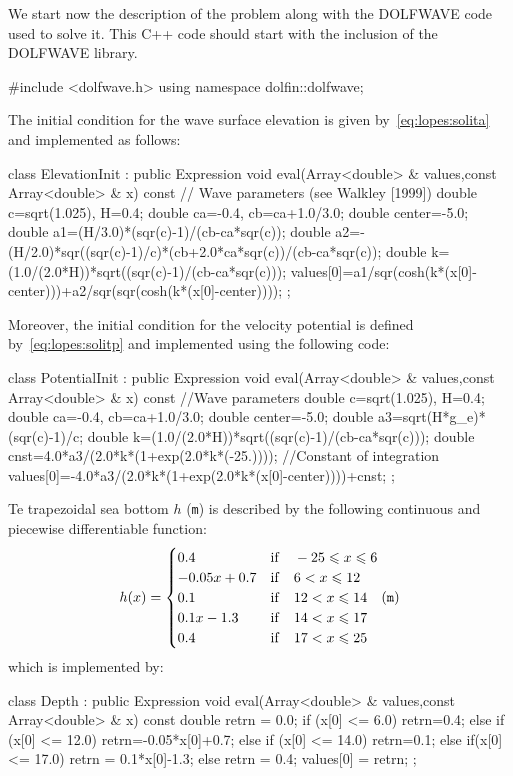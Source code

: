 We start now the description of the problem along with the DOLFWAVE
code used to solve it. This C++ code should start with the inclusion
of the DOLFWAVE library.
\begin{c++}
#include <dolfwave.h>
using namespace dolfin::dolfwave;
\end{c++}
The initial condition for the wave surface elevation is
given by~\eqref{eq:lopes:solita} and implemented as follows:
\begin{c++}
class ElevationInit : public Expression
{
  void eval(Array<double> & values,const Array<double> & x) const
  {
    // Wave parameters (see Walkley [1999])
    double c=sqrt(1.025), H=0.4;
    double ca=-0.4, cb=ca+1.0/3.0;
    double center=-5.0;
    double a1=(H/3.0)*(sqr(c)-1)/(cb-ca*sqr(c));
    double a2=-(H/2.0)*sqr((sqr(c)-1)/c)*(cb+2.0*ca*sqr(c))/(cb-ca*sqr(c));
    double k=(1.0/(2.0*H))*sqrt((sqr(c)-1)/(cb-ca*sqr(c)));
    values[0]=a1/sqr(cosh(k*(x[0]-center)))+a2/sqr(sqr(cosh(k*(x[0]-center))));
  }
};
\end{c++}
Moreover, the initial condition for the velocity potential is defined
by~\eqref{eq:lopes:solitp} and implemented using the following code:
\begin{c++}
class PotentialInit :  public Expression
{
  void eval(Array<double> & values,const Array<double> & x) const
  { //Wave parameters
    double c=sqrt(1.025), H=0.4;
    double ca=-0.4, cb=ca+1.0/3.0;
    double center=-5.0;
    double a3=sqrt(H*g_e)*(sqr(c)-1)/c;
    double k=(1.0/(2.0*H))*sqrt((sqr(c)-1)/(cb-ca*sqr(c)));
    double cnst=4.0*a3/(2.0*k*(1+exp(2.0*k*(-25.)))); //Constant of integration
    values[0]=-4.0*a3/(2.0*k*(1+exp(2.0*k*(x[0]-center))))+cnst;
  }
};
\end{c++}

Te trapezoidal sea bottom $h$ ({\tt m}) is described by the following
continuous and piecewise differentiable function:
\begin{equation}
  \label{eq:lopes:piecewisebottom}
  h(x)=\begin{cases}
    0.4& {\rm if}\quad -25 \leqslant x\leqslant 6\\
    -0.05x+0.7& {\rm if}\quad 6< x\leqslant 12\\
    0.1& {\rm if}\quad 12< x\leqslant 14\\
    0.1x-1.3& {\rm if}\quad 14< x\leqslant 17\\
    0.4& {\rm if}\quad 17< x\leqslant 25
  \end{cases}  ({\tt m})
\end{equation}
which is implemented by:
\begin{c++}
class Depth :  public Expression
{
  void eval(Array<double> & values,const Array<double> & x) const
  {
    double retrn = 0.0;
    if (x[0] <= 6.0)
      retrn=0.4;
    else if (x[0] <= 12.0)
      retrn=-0.05*x[0]+0.7;
    else if (x[0] <= 14.0)
      retrn=0.1;
    else if(x[0] <= 17.0)
      retrn = 0.1*x[0]-1.3;
    else
      retrn = 0.4;
    values[0] = retrn;
  }
};
\end{c++}

